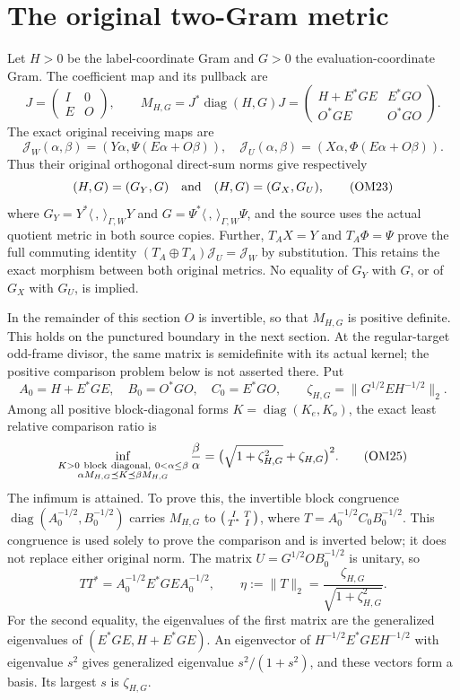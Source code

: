 \documentclass[11pt]{article}
\newcommand{\diag}{\operatorname{diag}}
\begin{document}
\section{The original two-Gram metric}
Let $H>0$ be the label-coordinate Gram and $G>0$ the
evaluation-coordinate Gram.  The coefficient map and its pullback
are
\[
J=\begin{pmatrix}I&0\\E&O\end{pmatrix},\qquad
M_{H,G}=J^*\diag(H,G)J
=\begin{pmatrix}H+E^*GE&E^*GO\\O^*GE&O^*GO\end{pmatrix}.
\tag{OM21}
\]
The exact original receiving maps are
\[
\mathcal J_W(\alpha,\beta)
 =(Y\alpha,\Psi(E\alpha+O\beta)),\quad
\mathcal J_U(\alpha,\beta)
 =(X\alpha,\Phi(E\alpha+O\beta)).
\tag{OM22}
\]
Thus their original orthogonal direct-sum norms give respectively
\[
(H,G)=(G_Y,G)\quad\hbox{and}\quad(H,G)=(G_X,G_U),
\tag{OM23}
\]
where $G_Y=Y^*\langle\, ,\,\rangle_{\Gamma,W}Y$ and
$G=\Psi^*\langle\, ,\,\rangle_{\Gamma,W}\Psi$, and the source
uses the actual quotient metric in both source copies.  Further,
$T_AX=Y$ and $T_A\Phi=\Psi$ prove the full commuting identity
$(T_A\oplus T_A)\mathcal J_U=\mathcal J_W$ by substitution.
This retains the exact morphism between both original metrics.
No equality of $G_Y$ with $G$, or of $G_X$ with $G_U$, is implied.

In the remainder of this section $O$ is invertible, so that $M_{H,G}$
is positive definite.  This holds on the punctured boundary in
the next section.  At the regular-target odd-frame divisor, the
same matrix is semidefinite with its actual kernel; the positive
comparison problem below is not asserted there.
Put
\[
A_0=H+E^*GE,\quad B_0=O^*GO,\quad C_0=E^*GO,\qquad
\zeta_{H,G}=\|G^{1/2}EH^{-1/2}\|_2 .
\tag{OM24}
\]
Among all positive block-diagonal forms $K=\diag(K_e,K_o)$,
the exact least relative comparison ratio is
\[
\inf_{\substack{K>0\ {\rm block\ diagonal},\ 0<\alpha\le\beta\\
                 \alpha M_{H,G}\preceq K\preceq\beta M_{H,G}}}
\frac{\beta}{\alpha}
=\bigl(\sqrt{1+\zeta_{H,G}^2}+\zeta_{H,G}\bigr)^2.
\tag{OM25}
\]
The infimum is attained.  To prove this, the invertible block
congruence $\diag(A_0^{-1/2},B_0^{-1/2})$ carries $M_{H,G}$ to
$\begin{psmallmatrix}I&T\\T^*&I\end{psmallmatrix}$, where
$T=A_0^{-1/2}C_0B_0^{-1/2}$.  This congruence is used solely
to prove the comparison and is inverted below; it does not
replace either original norm.  The matrix
$U=G^{1/2}OB_0^{-1/2}$ is unitary, so
\[
TT^*=A_0^{-1/2}E^*GEA_0^{-1/2},\qquad
\eta:=\|T\|_2=\frac{\zeta_{H,G}}{\sqrt{1+\zeta_{H,G}^2}}.
\tag{OM26}
\]
For the second equality, the eigenvalues of the first matrix are
the generalized eigenvalues of $(E^*GE,H+E^*GE)$.
An eigenvector of $H^{-1/2}E^*GEH^{-1/2}$ with eigenvalue
$s^2$ gives generalized eigenvalue $s^2/(1+s^2)$, and these
vectors form a basis.  Its largest $s$ is $\zeta_{H,G}$.
\end{document}

